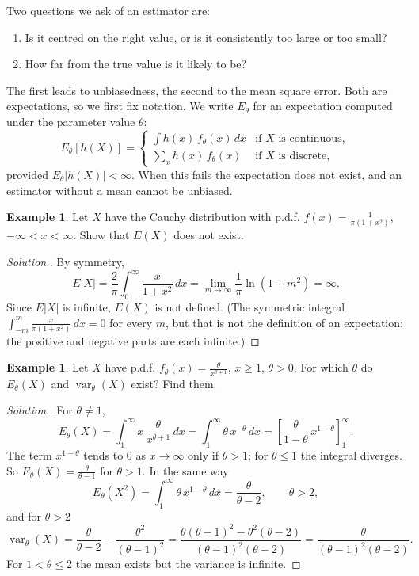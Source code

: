 \documentclass[12pt,a4paper]{report}
\theoremstyle{definition}
\newtheorem{exa}[thm]{Example}
\DeclareMathOperator{\var}{var}
\newenvironment{solution}
  {\renewcommand{\qedsymbol}{}\begin{proof}[\textit{Solution}.]}
  {\end{proof}}
\begin{document}
Two questions we ask of an estimator are:
\begin{enumerate}
\item Is it centred on the right value, or is it consistently too large or too
small?
\item How far from the true value is it likely to be?
\end{enumerate}
The first leads to unbiasedness, the second to the mean square error. Both are
expectations, so we first fix notation. We write $E_\theta$ for an expectation
computed under the parameter value $\theta$:
\[E_\theta\left[h(X)\right] = \begin{cases}
\int h(x)\, f_\theta(x)\, dx & \text{if } X \text{ is continuous},\\[1ex]
\sum_x h(x)\, f_\theta(x) & \text{if } X \text{ is discrete},
\end{cases}\]
provided $E_\theta|h(X)| < \infty$. When this fails the expectation does not exist,
and an estimator without a mean cannot be unbiased.

\begin{exa}
\label{ex:cauchymean}
Let $X$ have the Cauchy distribution with p.d.f.
$f(x) = \frac{1}{\pi(1 + x^2)}$, $-\infty < x < \infty$. Show that $E(X)$ does not
exist.
\end{exa}

\begin{solution}
By symmetry,
\[E|X| = \frac{2}{\pi}\int^{\infty}_{0} \frac{x}{1 + x^2}\, dx
= \lim_{m\to\infty} \frac{1}{\pi}\ln\left(1 + m^2\right) = \infty .\]
Since $E|X|$ is infinite, $E(X)$ is not defined. (The symmetric integral
$\int_{-m}^m \frac{x}{\pi(1+x^2)}\,dx = 0$ for every $m$, but that is not the
definition of an expectation: the positive and negative parts are each infinite.)
\end{solution}

\begin{exa}
\label{ex:paretomoments}
Let $X$ have p.d.f. $f_\theta(x) = \frac{\theta}{x^{\theta + 1}}$, $x\ge 1$,
$\theta>0$. For which $\theta$ do $E_\theta(X)$ and $\var_\theta(X)$ exist? Find
them.
\end{exa}

\begin{solution}
For $\theta\ne 1$,
\[E_\theta(X) = \int_1^\infty x\,\frac{\theta}{x^{\theta + 1}}\, dx
= \int_1^\infty \theta\, x^{-\theta}\, dx
= \left[\frac{\theta}{1 - \theta}\, x^{1 - \theta}\right]_1^\infty .\]
The term $x^{1-\theta}$ tends to $0$ as $x\to\infty$ only if $\theta>1$; for
$\theta\le 1$ the integral diverges. So $E_\theta(X) = \frac{\theta}{\theta - 1}$
for $\theta>1$. In the same way
\[E_\theta(X^2) = \int_1^\infty \theta\, x^{1 - \theta}\, dx = \frac{\theta}{\theta - 2},
\qquad \theta>2 ,\]
and for $\theta>2$
\[\var_\theta(X) = \frac{\theta}{\theta - 2} - \frac{\theta^2}{(\theta - 1)^2}
= \frac{\theta(\theta - 1)^2 - \theta^2(\theta - 2)}{(\theta - 1)^2(\theta - 2)}
= \frac{\theta}{(\theta - 1)^2(\theta - 2)} .\]
For $1<\theta\le 2$ the mean exists but the variance is infinite.
\end{solution}
\end{document}
